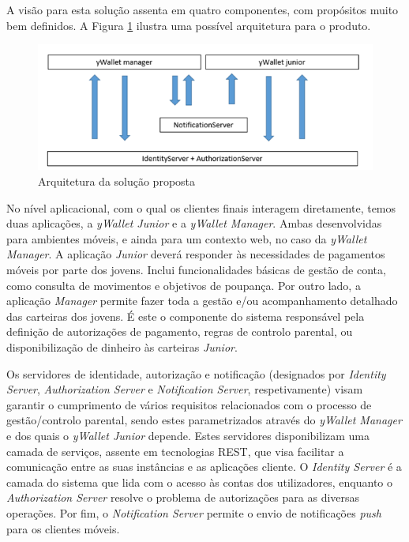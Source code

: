 \documentclass[12pt,a4paper]{article}
\begin{document}
      A visão para esta solução assenta em quatro componentes, com propósitos muito bem definidos. A Figura \ref{img1} ilustra uma possível arquitetura para o produto.

      \begin{figure}[ht!]
        \centering
          \includegraphics[width=0.7\linewidth]{img/img1}
          \caption{Arquitetura da solução proposta}
          \label{img1}
      \end{figure}

      No nível aplicacional, com o qual os clientes finais interagem diretamente, temos duas aplicações, a \emph{yWallet Junior} e a \emph{yWallet Manager}. Ambas desenvolvidas para ambientes móveis, e ainda para um contexto web, no caso da \emph{yWallet Manager}. A aplicação \emph{Junior} deverá responder às necessidades de pagamentos móveis por parte dos jovens. Inclui funcionalidades básicas de gestão de conta, como consulta de movimentos e objetivos de poupança. Por outro lado, a aplicação \emph{Manager} permite fazer toda a gestão e/ou acompanhamento detalhado das carteiras dos jovens. É este o componente do sistema responsável pela definição de autorizações de pagamento, regras de controlo parental, ou disponibilização de dinheiro às carteiras \emph{Junior}.

      Os servidores de identidade, autorização e notificação (designados por \emph{Identity Server}, \emph{Authorization Server} e \emph{Notification Server}, respetivamente) visam garantir o cumprimento de vários requisitos relacionados com o processo de gestão/controlo parental, sendo estes parametrizados através do \emph{yWallet Manager} e dos quais o \emph{yWallet Junior} depende. Estes servidores disponibilizam uma camada de serviços, assente em tecnologias REST, que visa facilitar a comunicação entre as suas instâncias e as aplicações cliente. O \emph{Identity Server} é a camada do sistema que lida com o acesso às contas dos utilizadores, enquanto o \emph{Authorization Server} resolve o problema de autorizações para as diversas operações. Por fim, o \emph{Notification Server} permite o envio de notificações \emph{push} para os clientes móveis.
\end{document}
